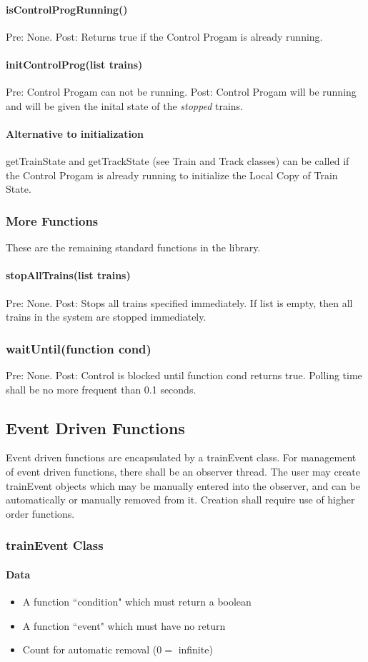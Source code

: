 \documentclass[a4paper,11pt,notitlepage]{article}
\def\CS{Control Progam\xspace}
\def\LC{Local Copy of Train State\xspace}
\begin{document}
\paragraph{isControlProgRunning()} Pre: None. Post: Returns true if the \CS is already running.
\paragraph{initControlProg(list trains)} Pre: \CS can not be running. Post: \CS will be running and will be given the inital state of the \emph{stopped} trains.
\paragraph{Alternative to initialization} getTrainState and getTrackState (see Train and Track classes) can be called if the \CS is already running to initialize the \LC.
\subsubsection{More Functions}
These are the remaining standard functions in the library.
\paragraph{stopAllTrains(list trains)} Pre: None. Post: Stops all trains specified immediately. If list is empty, then all trains in the system are stopped immediately.
\subsubsection{waitUntil(function cond)} Pre: None. Post: Control is blocked until function cond returns true. Polling time shall be no more frequent than 0.1 seconds.

\subsection{Event Driven Functions}
Event driven functions are encapsulated by a trainEvent class. For management of event driven functions, there shall be an observer thread. The user may create trainEvent objects which may be manually entered into the observer, and can be automatically or manually removed from it. Creation shall require use of higher order functions.
\subsubsection{trainEvent Class}
\paragraph{Data}
\begin{itemize}
\item A function ``condition" which must return a boolean
\item A function ``event" which must have no return
\item Count for automatic removal ($0 =$ infinite)
\end{itemize}
\end{document}
